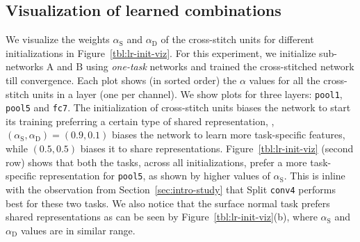 \documentclass[10pt,twocolumn,letterpaper]{article}
\begin{document}
\subsection{Visualization of learned combinations}
\label{sec:viz-lin}
We visualize the weights $\alpha_\mathrm{S}$ and $\alpha_\mathrm{D}$ of the cross-stitch units for different initializations in Figure~\ref{tbl:lr-init-viz}. For this experiment, we initialize sub-networks $\mathrm{A}$ and $\mathrm{B}$ using \emph{one-task} networks and trained the cross-stitched network till convergence. Each plot shows (in sorted order) the $\alpha$ values for all the cross-stitch units in a layer (one per channel). We show plots for three layers: \texttt{pool1}, \texttt{pool5} and \texttt{fc7}. The initialization of cross-stitch units biases the network to start its training preferring a certain type of shared representation, \eg, $\left(\alpha_\mathrm{S},\alpha_\mathrm{D}\right)=(0.9,0.1)$ biases the network to learn more task-specific features, while $(0.5,0.5)$ biases it to share representations. Figure~\ref{tbl:lr-init-viz} (second row) shows that both the tasks, across all initializations, prefer a more task-specific representation for \texttt{pool5}, as shown by higher values of $\alpha_\mathrm{S}$. This is inline with the observation from Section~\ref{sec:intro-study} that Split \texttt{conv4} performs best for these two tasks. We also notice that the surface normal task prefers shared representations as can be seen by Figure~\ref{tbl:lr-init-viz}(b), where $\alpha_\mathrm{S}$ and $\alpha_\mathrm{D}$ values are in similar range.
\end{document}

